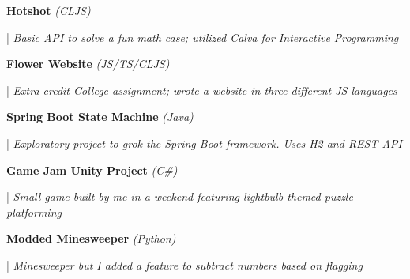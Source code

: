 \documentclass[letterpaper,11pt]{article}
\begin{document}
\begin{minipage}[t]{0.28\textwidth}
    \raggedright
    \textbf{ Hotshot }\textit{(CLJS)}\\
\end{minipage}
\hfill
\begin{minipage}[t]{0.70\textwidth}
    \raggedright
    |\textit{ Basic API to solve a fun math case; utilized Calva for Interactive Programming  } \\
\end{minipage}

\begin{minipage}[t]{0.28\textwidth}
    \raggedright
    \textbf{ Flower Website }\textit{(JS/TS/CLJS)} \\
\end{minipage}
\hfill
\begin{minipage}[t]{0.70\textwidth}
    \raggedright
    |\textit{ Extra credit College assignment; wrote a website in three different JS languages } \\
\end{minipage}

\begin{minipage}[t]{0.28\textwidth}
    \raggedright
    \textbf{ Spring Boot State Machine }\textit{(Java)} \\
\end{minipage}
\hfill
\begin{minipage}[t]{0.70\textwidth}
    \raggedright
    |\textit{ Exploratory project to grok the Spring Boot framework. Uses H2 and REST API} \\
\end{minipage}

\begin{minipage}[t]{0.28\textwidth}
    \raggedright
    \textbf{ Game Jam Unity Project }\textit{(C\#)} \\
\end{minipage}
\hfill
\begin{minipage}[t]{0.70\textwidth}
    \raggedright
    |\textit{ Small game built by me in a weekend featuring lightbulb-themed puzzle platforming} \\
\end{minipage}

\begin{minipage}[t]{0.28\textwidth}
    \raggedright
    \textbf{ Modded Minesweeper }\textit{(Python)} \\
\end{minipage}
\hfill
\begin{minipage}[t]{0.70\textwidth}
    \raggedright
    |\textit{ Minesweeper but I added a feature to subtract numbers based on flagging} \\
\end{minipage}
\end{document}
